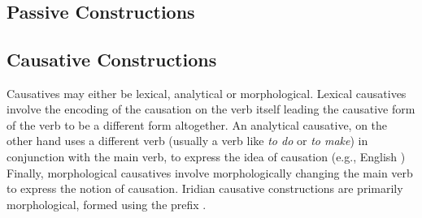 \pex{}
\\
\\
\\
\\
\\
\\
\xe



\subsection{Passive Constructions}


\subsection{Causative Constructions}

Causatives may either be lexical, analytical or morphological. Lexical causatives involve the encoding of the causation on the verb itself leading the causative form of the verb to be a different form altogether. An analytical causative, on the other hand uses a different verb (usually a verb like \emph{to do} or \emph{to make}) in conjunction with the main verb, to express the idea of causation (e.g., English ) Finally, morphological causatives involve morphologically changing the main verb to express the notion of causation. Iridian causative constructions are primarily morphological, formed using the prefix .

